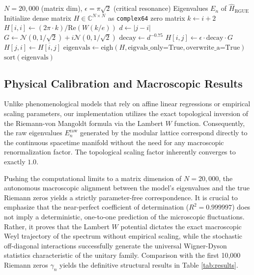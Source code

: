 \documentclass[prl,aps,floatfix,superscriptaddress,10pt]{revtex4-2}
\begin{document}
\begin{algorithm}[H]
\caption{Parameter-Free Riemann-GUE Ensemble Generation}
\label{alg:hamiltonian}
\begin{algorithmic}
\Require $N=20,000$ (matrix dim), $\epsilon=\pi\sqrt{2}$ (critical resonance)
\Ensure Eigenvalues $E_n$ of $\hat{H}_{\text{RGUE}}$
\State Initialize dense matrix $H \in \mathbb{C}^{N \times N}$ as \texttt{complex64} zero matrix
    \State $k \gets i+2$
    \State $H[i,i] \gets (2\pi \cdot k) / \text{Re}(W(k/e))$ 
        \State $d \gets |j-i|$
         
            \State $G \gets \mathcal{N}(0, 1/\sqrt{2}) + i\mathcal{N}(0, 1/\sqrt{2})$ 
            \State $\text{decay} \gets d^{-0.75}$ 
            \State $H[i,j] \gets \epsilon \cdot \text{decay} \cdot G$
            \State $H[j,i] \gets \overline{H[i,j]}$ 
        \EndIf
    \EndFor
\EndFor
\State $\text{eigenvals} \gets \text{eigh}(H, \text{eigvals\_only=True}, \text{overwrite\_a=True})$
\State \Return $\text{sort}(\text{eigenvals})$
\end{algorithmic}
\end{algorithm}

\subsection{Physical Calibration and Macroscopic Results}
Unlike phenomenological models that rely on affine linear regressions or empirical scaling parameters, our implementation utilizes the exact topological inversion of the Riemann-von Mangoldt formula via the Lambert $W$ function. Consequently, the raw eigenvalues $E_n^{\text{raw}}$ generated by the modular lattice correspond directly to the continuous spacetime manifold without the need for any macroscopic renormalization factor. The topological scaling factor inherently converges to exactly $1.0$.

Pushing the computational limits to a matrix dimension of $N=20,000$, the autonomous macroscopic alignment between the model's eigenvalues and the true Riemann zeros yields a strictly parameter-free correspondence. It is crucial to emphasize that the near-perfect coefficient of determination ($R^2 = 0.999997$) does not imply a deterministic, one-to-one prediction of the microscopic fluctuations. Rather, it proves that the Lambert $W$ potential dictates the exact macroscopic Weyl trajectory of the spectrum without empirical scaling, while the stochastic off-diagonal interactions successfully generate the universal Wigner-Dyson statistics characteristic of the unitary family. Comparison with the first 10,000 Riemann zeros $\gamma_n$ yields the definitive structural results in Table \ref{tab:results}.
\end{document}
